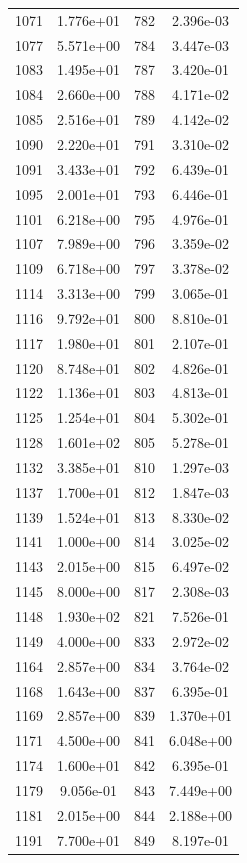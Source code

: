 \documentclass[12pt]{article}
\begin{document}
\begin{longtable}{@{}cccc@{}}
1071 & 1.776e+01 & 782 & 2.396e-03 \\
1077 & 5.571e+00 & 784 & 3.447e-03 \\
1083 & 1.495e+01 & 787 & 3.420e-01 \\
1084 & 2.660e+00 & 788 & 4.171e-02 \\
1085 & 2.516e+01 & 789 & 4.142e-02 \\
1090 & 2.220e+01 & 791 & 3.310e-02 \\
1091 & 3.433e+01 & 792 & 6.439e-01 \\
1095 & 2.001e+01 & 793 & 6.446e-01 \\
1101 & 6.218e+00 & 795 & 4.976e-01 \\
1107 & 7.989e+00 & 796 & 3.359e-02 \\
1109 & 6.718e+00 & 797 & 3.378e-02 \\
1114 & 3.313e+00 & 799 & 3.065e-01 \\
1116 & 9.792e+01 & 800 & 8.810e-01 \\
1117 & 1.980e+01 & 801 & 2.107e-01 \\
1120 & 8.748e+01 & 802 & 4.826e-01 \\
1122 & 1.136e+01 & 803 & 4.813e-01 \\
1125 & 1.254e+01 & 804 & 5.302e-01 \\
1128 & 1.601e+02 & 805 & 5.278e-01 \\
1132 & 3.385e+01 & 810 & 1.297e-03 \\
1137 & 1.700e+01 & 812 & 1.847e-03 \\
1139 & 1.524e+01 & 813 & 8.330e-02 \\
1141 & 1.000e+00 & 814 & 3.025e-02 \\
1143 & 2.015e+00 & 815 & 6.497e-02 \\
1145 & 8.000e+00 & 817 & 2.308e-03 \\
1148 & 1.930e+02 & 821 & 7.526e-01 \\
1149 & 4.000e+00 & 833 & 2.972e-02 \\
1164 & 2.857e+00 & 834 & 3.764e-02 \\
1168 & 1.643e+00 & 837 & 6.395e-01 \\
1169 & 2.857e+00 & 839 & 1.370e+01 \\
1171 & 4.500e+00 & 841 & 6.048e+00 \\
1174 & 1.600e+01 & 842 & 6.395e-01 \\
1179 & 9.056e-01 & 843 & 7.449e+00 \\
1181 & 2.015e+00 & 844 & 2.188e+00 \\
1191 & 7.700e+01 & 849 & 8.197e-01 \\

\end{longtable}
\end{document}

